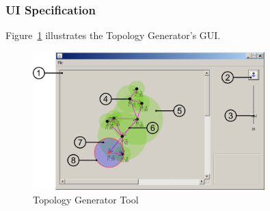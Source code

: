 \documentclass[11pt, titlepage, oneside]{article}
\begin{document}
\subsubsection{UI Specification} 
 
Figure~\ref{fig:tlpgen} illustrates the Topology Generator's GUI.
 
\newpage 
 
\begin{figure}[h] 
  \centering 
      \includegraphics[width=0.8\textwidth]{uiapp.png} 
  \caption{Topology Generator Tool} 
\label{fig:tlpgen} 
\end{figure} 
 
\end{document}
